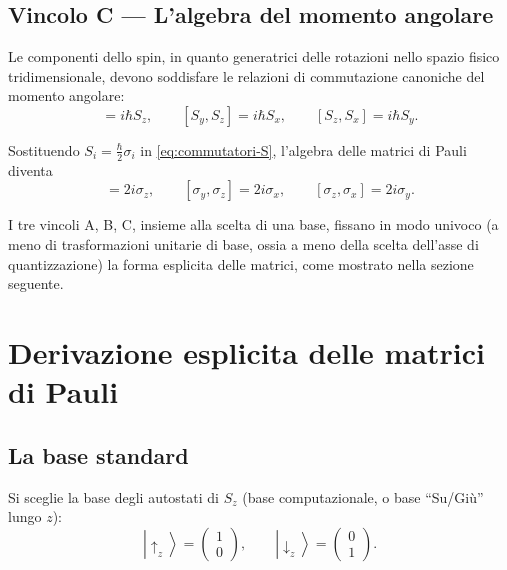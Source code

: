 \documentclass[11pt,a4paper]{article}
\newcommand{\ket}[1]{\left|#1\right\rangle}
\begin{document}
\subsection*{Vincolo C --- L'algebra del momento angolare}

Le componenti dello spin, in quanto generatrici delle rotazioni nello spazio fisico tridimensionale, devono soddisfare le relazioni di commutazione canoniche del momento angolare:
\begin{equation}
[S_x,S_y]=i\hbar S_z, \qquad [S_y,S_z]=i\hbar S_x, \qquad [S_z,S_x]=i\hbar S_y.
\label{eq:commutatori-S}
\end{equation}

Sostituendo $S_i=\frac{\hbar}{2}\sigma_i$ in \eqref{eq:commutatori-S}, l'algebra delle matrici di Pauli diventa
\begin{equation}
[\sigma_x,\sigma_y]=2i\sigma_z, \qquad [\sigma_y,\sigma_z]=2i\sigma_x, \qquad [\sigma_z,\sigma_x]=2i\sigma_y.
\label{eq:commutatori-sigma}
\end{equation}

I tre vincoli A, B, C, insieme alla scelta di una base, fissano in modo univoco (a meno di trasformazioni unitarie di base, ossia a meno della scelta dell'asse di quantizzazione) la forma esplicita delle matrici, come mostrato nella sezione seguente.

\section{Derivazione esplicita delle matrici di Pauli}

\subsection{La base standard}

Si sceglie la base degli autostati di $S_z$ (base computazionale, o base ``Su/Giù'' lungo $z$):
\begin{equation}
\ket{\uparrow_z} = \begin{pmatrix}1\\0\end{pmatrix}, \qquad
\ket{\downarrow_z} = \begin{pmatrix}0\\1\end{pmatrix}.
\label{eq:base-z}
\end{equation}
\end{document}
